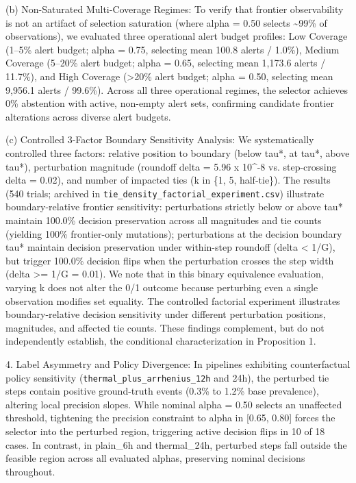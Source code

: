 \documentclass[11pt,a4paper]{article}
\begin{document}
(b) Non-Saturated Multi-Coverage Regimes: To verify that frontier observability is not an artifact of selection saturation (where alpha = 0.50 selects \textasciitilde{}99\% of observations), we evaluated three operational alert budget profiles: Low Coverage (1--5\% alert budget; alpha = 0.75, selecting mean 100.8 alerts / 1.0\%), Medium Coverage (5--20\% alert budget; alpha = 0.65, selecting mean 1,173.6 alerts / 11.7\%), and High Coverage (>20\% alert budget; alpha = 0.50, selecting mean 9,956.1 alerts / 99.6\%). Across all three operational regimes, the selector achieves 0\% abstention with active, non-empty alert sets, confirming candidate frontier alterations across diverse alert budgets.

(c) Controlled 3-Factor Boundary Sensitivity Analysis: We systematically controlled three factors: relative position to boundary (below tau*, at tau*, above tau*), perturbation magnitude (roundoff delta = 5.96 x 10\textasciicircum{}-8 vs. step-crossing delta = 0.02), and number of impacted ties (k in \{1, 5, half-tie\}). The results (540 trials; archived in \texttt{tie\_\allowbreak{}density\_\allowbreak{}factorial\_\allowbreak{}experiment.\allowbreak{}csv}) illustrate boundary-relative frontier sensitivity: perturbations strictly below or above tau* maintain 100.0\% decision preservation across all magnitudes and tie counts (yielding 100\% frontier-only mutations); perturbations at the decision boundary tau* maintain decision preservation under within-step roundoff (delta < 1/G), but trigger 100.0\% decision flips when the perturbation crosses the step width (delta >= 1/G = 0.01). We note that in this binary equivalence evaluation, varying k does not alter the 0/1 outcome because perturbing even a single observation modifies set equality. The controlled factorial experiment illustrates boundary-relative decision sensitivity under different perturbation positions, magnitudes, and affected tie counts. These findings complement, but do not independently establish, the conditional characterization in Proposition 1.

4. Label Asymmetry and Policy Divergence: In pipelines exhibiting counterfactual policy sensitivity (\texttt{thermal\_\allowbreak{}plus\_\allowbreak{}arrhenius\_\allowbreak{}12h} and 24h), the perturbed tie steps contain positive ground-truth events (0.3\% to 1.2\% base prevalence), altering local precision slopes. While nominal alpha = 0.50 selects an unaffected threshold, tightening the precision constraint to alpha in [0.65, 0.80] forces the selector into the perturbed region, triggering active decision flips in 10 of 18 cases. In contrast, in plain\_6h and thermal\_24h, perturbed steps fall outside the feasible region across all evaluated alphas, preserving nominal decisions throughout.
\end{document}
